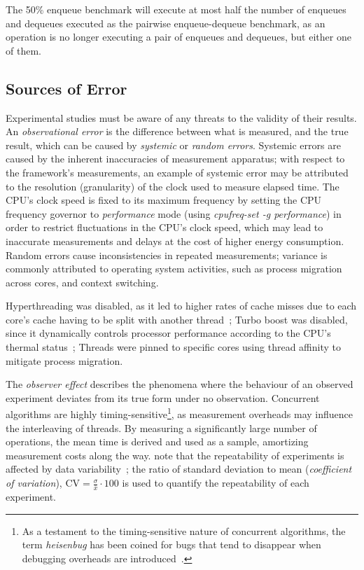 The 50\% enqueue benchmark will execute at most
half the number of enqueues and dequeues executed as the pairwise
enqueue-dequeue benchmark, as an operation is no longer executing a pair of
enqueues and dequeues, but either one of them.

\subsection{Sources of Error}
Experimental studies must be aware of any threats to the validity of
their results. An \emph{observational error} is the difference between what is
measured, and the true result, which can be caused by \emph{systemic} or
\emph{random errors}. Systemic errors are caused by the inherent inaccuracies
of measurement apparatus; with respect to the framework's
measurements, an example of systemic error may be attributed to the resolution
(granularity) of the clock used to measure elapsed time. The CPU's clock speed is
fixed to its maximum frequency by setting the CPU frequency governor to
\emph{performance} mode (using \emph{cpufreq-set -g performance}) in order to
restrict fluctuations in the CPU's clock speed, which may lead to inaccurate
measurements and delays at the cost of higher energy consumption. Random errors cause inconsistencies in repeated
measurements; variance is
commonly attributed to operating system activities, such as process migration
across cores, and context switching.

Hyperthreading was disabled, as it led to higher rates of cache misses due to each core's cache
having to be split with another thread~\citep{fog2020optimizing}; Turbo boost was
disabled, since it dynamically controls
processor performance according to the CPU's
thermal status~\citep[Section~14.3.3]{intel2021system}; Threads were pinned to
specific cores using thread affinity to mitigate process migration.

The \emph{observer effect} describes the phenomena where the behaviour of an
observed experiment deviates
from its true form under no observation. Concurrent algorithms are
highly timing-sensitive\footnote{As a testament to the timing-sensitive nature
of concurrent algorithms, the term \emph{heisenbug} has been coined for bugs
that tend to disappear when debugging overheads are
introduced~\cite{perfbook2021}.}, as measurement overheads may influence the
interleaving of threads. By measuring a significantly large
number of operations, the mean time is derived and used as a sample, amortizing
measurement costs along the way. \citeauthor{aceto2021benchmarking} note that
the repeatability of experiments is affected by data
variability~\citep{aceto2021benchmarking}; the ratio of standard deviation to
mean (\emph{coefficient of variation}), $\text{CV} = \frac{\sigma}{\bar{x}}
\cdot 100$ is used to quantify the repeatability of each experiment.

